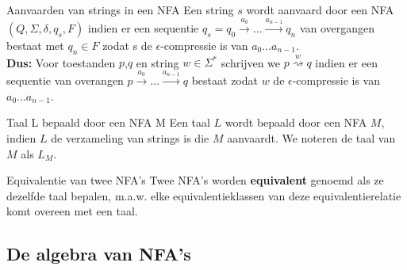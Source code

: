 \begin{theo}{Aanvaarden van strings in een NFA}
    Een string $s$ wordt aanvaard door een NFA $(Q,\Sigma, \delta, q_s, F)$ indien
    er een sequentie $q_s = q_0 \overset{a_0}{\longrightarrow} \ldots \overset{a_{n-1}}{\longrightarrow} q_n$
    van overgangen bestaat met $q_n \in F$ zodat s de $\epsilon$-compressie is van $a_0 \ldots a_{n-1}$. \\
    
    \noindent \textbf{Dus:} Voor toestanden $p$,$q$ en string $w \in \Sigma^*$ schrijven we $p \overset{w}{\rightsquigarrow} q$
    indien er een sequentie van overangen $ p \overset{a_0}{\longrightarrow} \ldots \overset{a_{n-1}}{\longrightarrow} q$ bestaat zodat $w$
    de $\epsilon$-compressie is van $a_0 \ldots a_{n-1}$.
\end{theo}

\begin{theo}{Taal L bepaald door een NFA M}
    Een taal $L$ wordt bepaald door een NFA $M$, indien $L$ de verzameling van strings is die $M$ aanvaardt.
    We noteren de taal van $M$ als $L_M$.
\end{theo}

\begin{theo}{Equivalentie van twee NFA's}
    Twee NFA's worden \textbf{equivalent} genoemd als ze dezelfde taal bepalen, m$.$a$.$w$.$ elke equivalentieklassen van deze equivalentierelatie komt overeen met een taal.
\end{theo}

\newpage

\subsection{De algebra van NFA's}

\vspace{0.5cm}

